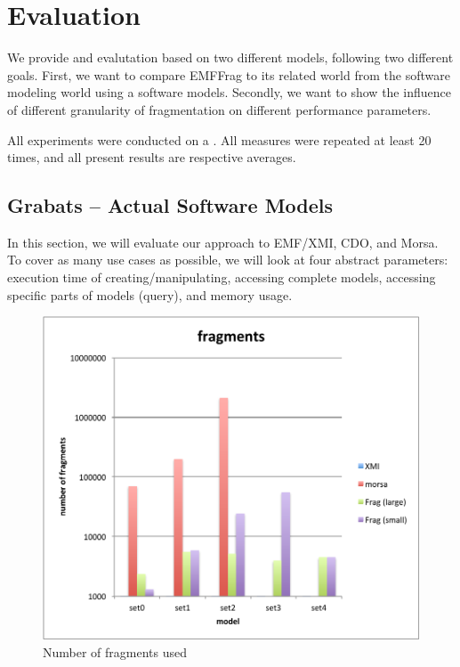 \section{Evaluation}
\label{sec:evaluation}

We provide and evalutation based on two different models, following two different goals. First, we want to compare EMFFrag to its related world from the software modeling world using a software models. Secondly, we want to show the influence of different granularity of fragmentation on different performance parameters.

All experiments were conducted on a . All measures were repeated at least 20 times, and all present results are respective averages.

\subsection{Grabats -- Actual Software Models}

In this section, we will evaluate our approach to EMF/XMI, CDO, and Morsa. To cover as many use cases as possible, we will look at four abstract parameters: execution time of creating/manipulating, accessing complete models, accessing specific parts of models (query), and memory usage.

\begin{figure}
  \centering
  \includegraphics[width=0.65\linewidth]{figures/grabatsFragments}
  \caption{Number of fragments used}
  \label{fig:grabatsFragments}
\end{figure}

